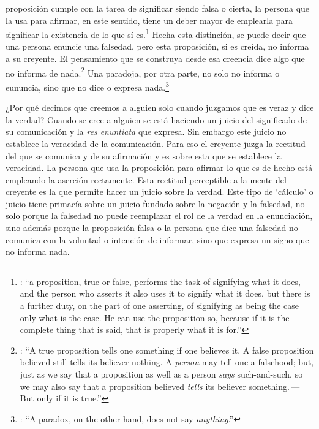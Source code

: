 proposición cumple con la tarea de significar siendo falsa o cierta, la persona que la usa para afirmar, en este sentido, tiene un deber mayor de emplearla para significar la existencia de lo que sí es.\footnote{\cite[Cf.~][267]{anscombe2015logic:tsa}: \enquote{a proposition, true or false, performs the task of signifying what it does, and the person who asserts it also uses it to signify what it does, but there is a further duty, on the part of one asserting, of signifying as being the case only what is the case. He can use the proposition so, because if it is the complete thing that is said, that is properly what it is for.}} Hecha esta distinción, se puede decir que una persona enuncie una falsedad, pero esta proposición, si es creída, no informa a su creyente. El pensamiento que se construya desde esa creencia dice algo que no informa de nada.\footnote{\cite[Cf.~][271]{anscombe2015logic:tsa}: \enquote{A true proposition tells one something if one believes it. A false proposition believed still tells its believer nothing. A \emph{person} may tell one a falsehood; but, just as we say that a proposition as well as a person \emph{says} such-and-such, so we may also say that a proposition believed \emph{tells} its believer something.\,---\,But only if it is true.}} Una paradoja, por otra parte, no solo no informa o eununcia, sino que no dice o expresa nada.\footnote{\cite[Cf.~][271]{anscombe2015logic:tsa}: \enquote{A paradox, on the other hand, does not say \emph{anything}.}}

¿Por qué decimos que creemos a alguien solo cuando juzgamos que es veraz y dice la verdad? Cuando se cree a alguien se está haciendo un juicio del significado de su comunicación y la \emph{res enuntiata} que expresa. Sin embargo este juicio no establece la veracidad de la comunicación. Para eso el creyente juzga la rectitud del que se comunica y de su afirmación y es sobre esta que se establece la veracidad. La persona que usa la proposición para afirmar lo que es de hecho está empleando la aserción rectamente. Esta rectitud perceptible a la mente del creyente es la que permite hacer un juicio sobre la verdad. Este tipo de `cálculo' o juicio tiene primacía sobre un juicio fundado sobre la negación y la falsedad, no solo porque la falsedad no puede reemplazar el rol de la verdad en la enunciación, sino además porque la proposición falsa o la persona que dice una falsedad no comunica con la voluntad o intención de informar, sino que expresa un signo que no informa nada.

